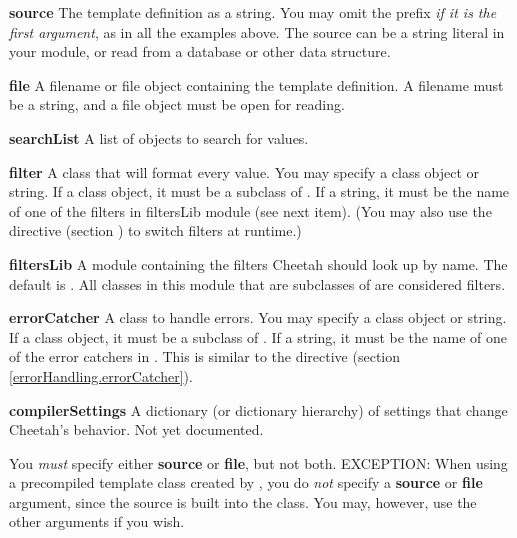 \begin{description}
\item{{\bf source}}
     The template definition as a string.  You may omit the 
     prefix {\em if it is the first argument}, as in all the examples above.
     The source can be a string literal in your module, or read from a database
     or other data structure.
\item{{\bf file}}
     A filename or file object containing the template definition.
     A filename must be a string, and a file object must be open for reading.
\item{{\bf searchList}}
     A list of objects to search for  values.
\item{{\bf filter}}
     A class that will format every  value.  You may
     specify a class object or string.  If a class object,
     it must be a subclass of .  If a string, it
     must be the name of one of the filters in filtersLib module (see next 
     item).
     (You may also use the  directive (section
     \label{output.filter}) to switch filters at runtime.)
\item{{\bf filtersLib}}
     A module containing the filters Cheetah should look up by name.  The
     default is .  All classes in this module that are
     subclasses of  are considered filters.
\item{{\bf errorCatcher}}
     A class to handle  errors.  You may
     specify a class object or string.  If a class object,
     it must be a subclass of .  
     If a string, it must be the name of one of the error catchers in
     .  This is similar to the 
      directive 
     (section \ref{errorHandling.errorCatcher}).
\item{{\bf compilerSettings}}
     A dictionary (or dictionary hierarchy) of settings that change Cheetah's
     behavior.  Not yet documented.
\end{description}

You {\em must} specify either {\bf source} or {\bf file}, but not both.  
EXCEPTION: When using a precompiled template class created by
, you do {\em not} specify a {\bf source} or {\bf
file} argument, since the source is built into the class.  You may, however,
use the other arguments if you wish.

